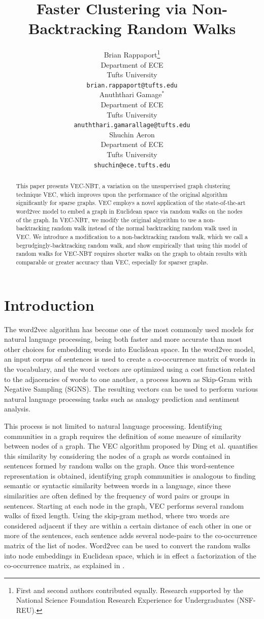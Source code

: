 \documentclass{article} %
\title{Faster Clustering via Non-Backtracking Random Walks}
\author{
Brian Rappaport\thanks{First and second authors contributed equally. Research supported by the National Science Foundation Research Experience for Undergraduates (NSF-REU).} \\
Department of ECE\\
Tufts University\\
\texttt{brian.rappaport@tufts.edu} \\
\And
Anuththari Gamage$^*$ \\
Department of ECE\\
Tufts University\\
\texttt{anuththari.gamarallage@tufts.edu} \\
\AND
Shuchin Aeron \\
Department of ECE\\
Tufts University\\
\texttt{shuchin@ece.tufts.edu} 
}
\begin{document}
\maketitle

\begin{abstract}
This paper presents VEC-NBT, a variation on the unsupervised graph clustering technique VEC, which improves upon the performance of the original algorithm significantly for sparse graphs. VEC employs a novel application of the state-of-the-art word2vec model to embed a graph in Euclidean space via random walks on the nodes of the graph. In VEC-NBT, we modify the original algorithm to use a non-backtracking random walk instead of the normal backtracking random walk used in VEC. We introduce a modification to a non-backtracking random walk, which we call a begrudgingly-backtracking random walk, and show empirically that using this model of random walks for VEC-NBT requires shorter walks on the graph to obtain results with comparable or greater accuracy than VEC, especially for sparser graphs.
\end{abstract}

\section{Introduction}

The word2vec algorithm \cite{word2vec} has become one of the most commonly used models for natural language processing, being both faster and more accurate than most other choices for embedding words into Euclidean space. In the word2vec model, an input corpus of sentences is used to create a co-occurrence matrix of words in the vocabulary, and the word vectors are optimized using a cost function related to the adjacencies of words to one another, a process known as Skip-Gram with Negative Sampling (SGNS). The resulting vectors can be used to perform various natural language processing tasks such as analogy prediction and sentiment analysis.

This process is not limited to natural language processing. Identifying communities in a graph requires the definition of some measure of similarity between nodes of a graph. The VEC algorithm proposed by Ding et al. \cite{NodeEmbed} quantifies this similarity by considering the nodes of a graph as words contained in sentences formed by random walks on the graph. Once this word-sentence representation is obtained, identifying graph communities is analogous to finding semantic or syntactic similarity between words in a language, since these similarities are often defined by the frequency of word pairs or groups in sentences. Starting at each node in the graph, VEC performs several random walks of fixed length. Using the skip-gram method, where two words are considered adjacent if they are within a certain distance of each other in one or more of the sentences, each sentence adds several node-pairs to the co-occurrence matrix of the list of nodes. Word2vec can be used to convert the random walks into node embeddings in Euclidean space, which is in effect a factorization of the co-occurrence matrix, as explained in \cite{LevyGoldberg}.
\end{document}

